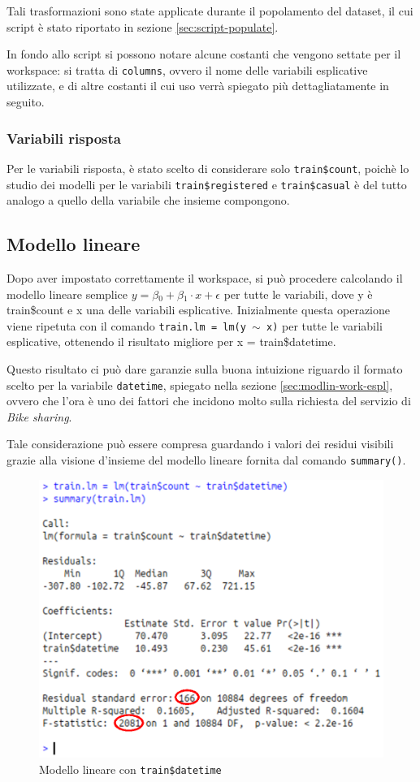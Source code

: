 Tali trasformazioni sono state applicate durante il popolamento del dataset, il
cui script è stato riportato in sezione \ref{sec:script-populate}.

In fondo allo script si possono notare alcune costanti che vengono settate per
il workspace: si tratta di \texttt{columns}, ovvero il nome delle variabili
esplicative utilizzate, e di altre costanti il cui uso verrà spiegato più
dettagliatamente in seguito.

\subsubsection{Variabili risposta}
Per le variabili risposta, è stato scelto di considerare solo
\texttt{train\$count}, poichè lo studio dei modelli per le variabili
\texttt{train\$registered} e \texttt{train\$casual} è del tutto analogo a
quello della variabile che insieme compongono.

\subsection{Modello lineare}
Dopo aver impostato correttamente il workspace, si può procedere calcolando il
modello lineare semplice $ y = \beta{}_0 + \beta{}_1 \cdot{} x + \epsilon{} $
per tutte le variabili, dove y è train\$count e x una delle variabili
esplicative.
Inizialmente questa operazione viene ripetuta con il comando \texttt{train.lm
= lm(y $ \sim{} $ x)} per tutte le variabili esplicative, ottenendo il
risultato migliore per x = train\$datetime.

Questo risultato ci può dare garanzie sulla buona intuizione riguardo il
formato scelto per la variabile \texttt{datetime}, spiegato nella sezione
\ref{sec:modlin-work-espl}, ovvero che l'ora è uno dei fattori che incidono
molto sulla richiesta del servizio di \emph{Bike sharing}.

Tale considerazione può essere compresa guardando i valori dei residui visibili
grazie alla visione d'insieme del modello lineare fornita dal comando
\texttt{summary()}.

\begin{figure}[H]\label{fig:simplest-linear-model}
  \centering
  \includegraphics[width=.7\columnwidth]{images/simplest-linear-model.eps}
  \caption{Modello lineare con \texttt{train\$datetime}}
\end{figure}

